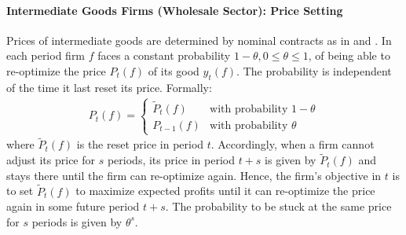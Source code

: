 \paragraph{Intermediate Goods Firms (Wholesale Sector): Price Setting}

Prices of intermediate goods are determined by nominal contracts as in \textcite{Calvo_1983_StaggeredPricesUtilitymaximizing} and \textcite{Yun_1996_NominalPriceRigidity}.
In each period firm $f$ faces a constant probability $1-\theta, 0\leq \theta \leq 1$,
  of being able to re-optimize the price $P_t(f)$ of its good $y_t(f)$.
The probability is independent of the time it last reset its price.
Formally:
\begin{align}
P_t(f) = \begin{cases}
\widetilde{P}_t(f) & \text{with probability } 1-\theta\\
P_{t-1}(f) & \text{with probability } \theta
\end{cases}
\label{eq:NewKeynesian.CalvoMechanism}
\end{align}
where $\widetilde{P}_t(f)$ is the reset price in period $t$.
Accordingly, when a firm cannot adjust its price for $s$ periods,
  its price in period $t+s$ is given by $\widetilde{P}_t(f)$ and stays there until the firm can re-optimize again.
Hence, the firm's objective in $t$ is to set $\widetilde{P}_t(f)$ to maximize expected profits
  until it can re-optimize the price again in some future period $t+s$.
The probability to be stuck at the same price for $s$ periods is given by $\theta^s$.

